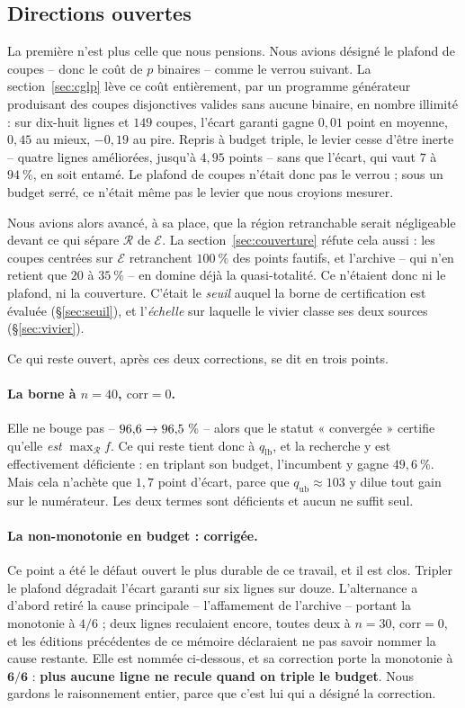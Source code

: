 \documentclass[11pt,a4paper]{article}
\theoremstyle{plain}
\theoremstyle{remark}
\newcommand{\Ecal}{\mathcal{E}}
\newcommand{\Rcal}{\mathcal{R}}
\begin{document}
\subsection*{Directions ouvertes}

La première n'est plus celle que nous pensions. Nous avions désigné le
plafond de coupes -- donc le coût de $p$ binaires -- comme le verrou
suivant. La section~\ref{sec:cglp} lève ce coût entièrement, par un
programme générateur produisant des coupes disjonctives valides sans aucune
binaire, en nombre illimité : sur dix-huit lignes et $149$ coupes, l'écart
garanti gagne $0{,}01$ point en moyenne, $0{,}45$ au mieux, $-0{,}19$ au
pire. Repris à budget triple, le levier cesse d'être inerte -- quatre lignes
améliorées, jusqu'à $4{,}95$ points -- sans que l'écart, qui vaut $7$ à
$94\ \%$, en soit entamé. Le plafond de coupes n'était donc pas le verrou ;
sous un budget serré, ce n'était même pas le levier que nous croyions
mesurer.

Nous avions alors avancé, à sa place, que la région retranchable serait
négligeable devant ce qui sépare $\Rcal$ de $\Ecal$. La
section~\ref{sec:couverture} réfute cela aussi : les coupes centrées sur
$\Ecal$ retranchent $100\ \%$ des points fautifs, et l'archive -- qui n'en
retient que $20$ à $35\ \%$ -- en domine déjà la quasi-totalité. Ce
n'étaient donc ni le plafond, ni la couverture. C'était le \emph{seuil}
auquel la borne de certification est évaluée (§\ref{sec:seuil}), et
l'\emph{échelle} sur
laquelle le vivier classe ses deux sources (§\ref{sec:vivier}).

Ce qui reste ouvert, après ces deux corrections, se dit en trois points.

\paragraph{La borne à $n=40$, $\text{corr}=0$.} Elle ne bouge pas --
$96{,}6{}\to 96{,}5{}\ \%$ -- alors que le statut « convergée » certifie qu'elle
\emph{est} $\max_{\Rcal}f$. Ce qui reste tient donc à $q_{\text{lb}}$, et la
recherche y est effectivement déficiente : en triplant son budget,
l'incumbent y gagne $49{,}6\ \%$. Mais cela n'achète que $1{,}7$ point
d'écart, parce que $q_{\text{ub}}\approx 103$ y dilue tout gain sur le
numérateur. Les deux termes sont déficients et aucun ne suffit seul.

\paragraph{La non-monotonie en budget : corrigée.} Ce point a été le défaut
ouvert le plus durable de ce travail, et il est clos. Tripler le plafond
dégradait l'écart garanti sur six lignes sur douze. L'alternance a d'abord
retiré la cause principale -- l'affamement de l'archive -- portant la
monotonie à $4/6$ ; deux lignes reculaient encore, toutes deux à $n=30$,
$\text{corr}=0$, et les éditions précédentes de ce mémoire déclaraient ne
pas savoir nommer la cause restante. Elle est nommée ci-dessous, et sa
correction porte la monotonie à $\mathbf{6/6}$ : \textbf{plus aucune ligne
ne recule quand on triple le budget}. Nous gardons le raisonnement entier,
parce que c'est lui qui a désigné la correction.
\end{document}
